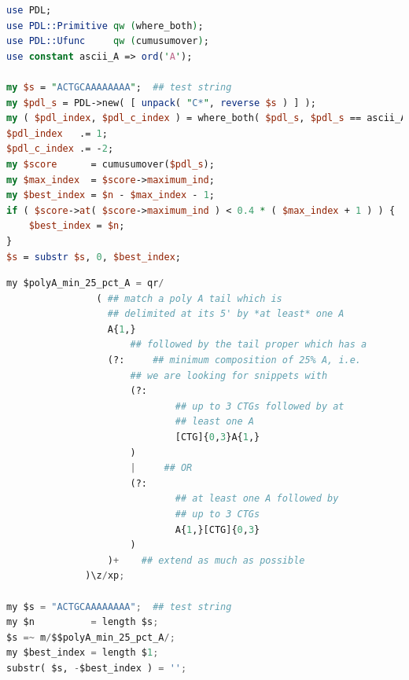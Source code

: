 \documentclass[10pt]{article}
\begin{document}
\noindent\hspace{0.08\linewidth}\begin{minipage}{0.84\textwidth}
\begin{lstlisting}[language=Perl,basicstyle=\footnotesize,frame=none,caption={Perl code for a modified \texttt{cutadapt} that uses \texttt{PDL}.},label={lst:CutadaptInPDL},captionpos=b]
use PDL;
use PDL::Primitive qw (where_both);
use PDL::Ufunc     qw (cumusumover);
use constant ascii_A => ord('A');

my $s = "ACTGCAAAAAAAA";  ## test string   
my $pdl_s = PDL->new( [ unpack( "C*", reverse $s ) ] );
my ( $pdl_index, $pdl_c_index ) = where_both( $pdl_s, $pdl_s == ascii_A );
$pdl_index   .= 1;
$pdl_c_index .= -2;
my $score      = cumusumover($pdl_s);
my $max_index  = $score->maximum_ind;
my $best_index = $n - $max_index - 1;
if ( $score->at( $score->maximum_ind ) < 0.4 * ( $max_index + 1 ) ) {
    $best_index = $n;
}
$s = substr $s, 0, $best_index;
\end{lstlisting}
\end{minipage}

\noindent\hspace{0.15\linewidth}\begin{minipage}{0.70\textwidth}
\begin{lstlisting}[language=Python,basicstyle=\footnotesize,frame=none,caption={A regex for \texttt{cutadapt}.},label={lst:CutadaptAsRegex},captionpos=b]
my $polyA_min_25_pct_A = qr/
                ( ## match a poly A tail which is 
                  ## delimited at its 5' by *at least* one A
                  A{1,}
                      ## followed by the tail proper which has a    
                  (?:     ## minimum composition of 25% A, i.e.
                      ## we are looking for snippets with 
                      (?: 
                              ## up to 3 CTGs followed by at 
                              ## least one A
                              [CTG]{0,3}A{1,}    
                      )
                      |     ## OR
                      (?: 
                              ## at least one A followed by 
                              ## up to 3 CTGs
                              A{1,}[CTG]{0,3}
                      )
                  )+    ## extend as much as possible
              )\z/xp;

my $s = "ACTGCAAAAAAAA";  ## test string              
my $n          = length $s;
$s =~ m/$$polyA_min_25_pct_A/;
my $best_index = length $1;
substr( $s, -$best_index ) = '';
    
\end{lstlisting}
\end{minipage}
\end{document}
